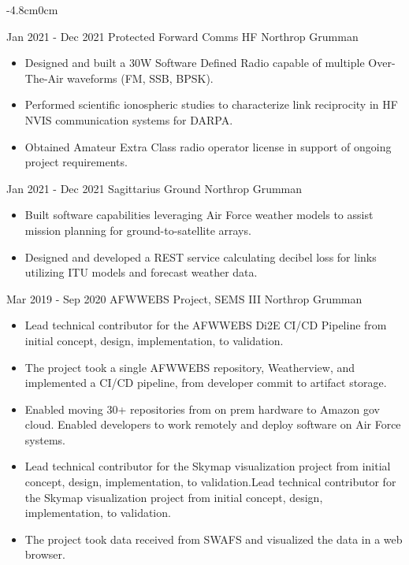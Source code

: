 \documentclass[]{src/friggeri-cv}
\begin{document}
\clearpage

\begin{adjustwidth}{-4.8cm}{0cm} 
\begin{entrylist}
  \entry
    {Jan 2021 - Dec 2021}
    {Protected Forward Comms HF}
    {Northrop Grumman}
    {\begin{itemize}
        \item Designed and built a 30W Software Defined Radio capable of multiple Over-The-Air waveforms (FM, SSB, BPSK).
        \item Performed scientific ionospheric studies to characterize link reciprocity in HF NVIS communication systems for DARPA.
        \item Obtained Amateur Extra Class radio operator license in support of ongoing project requirements.
    \end{itemize}}
  \entry
    {Jan 2021 - Dec 2021}
    {Sagittarius Ground}
    {Northrop Grumman}
    {\begin{itemize}
        \item Built software capabilities leveraging Air Force weather models to assist mission planning for ground-to-satellite arrays.
        \item Designed and developed a REST service calculating decibel loss for links utilizing ITU models and forecast weather data.
    \end{itemize}}
  \entry
    {Mar 2019 - Sep 2020}
    {AFWWEBS Project, SEMS III}
    {Northrop Grumman}
    {\begin{itemize}
        \item Lead technical contributor for the AFWWEBS Di2E CI/CD Pipeline from initial concept, design, implementation, to validation.
        \item The project took a single AFWWEBS repository, Weatherview, and implemented a CI/CD pipeline, from developer commit to artifact storage.
        \item Enabled moving 30+ repositories from on prem hardware to Amazon gov cloud. Enabled developers to work remotely and deploy software on Air Force systems.
        \item Lead technical contributor for the Skymap visualization project from initial concept, design, implementation, to validation.Lead technical contributor for the Skymap visualization project from initial concept, design, implementation, to validation.
        \item The project took data received from SWAFS and visualized the data in a web browser.

\end{itemize}}
\end{entrylist}
\end{adjustwidth}
\end{document}

